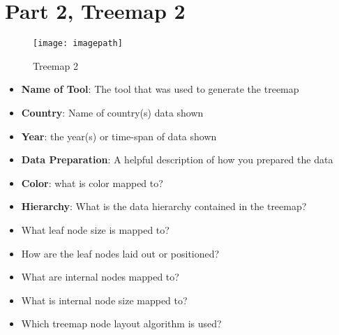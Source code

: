 \hypertarget{part-2-treemap-2}{%
\section{Part 2, Treemap 2}\label{part-2-treemap-2}}

\begin{figure}
\centering
\texttt{[image: imagepath]}
\caption{Treemap 2}
\end{figure}

\begin{itemize}
\tightlist
\item
  \textbf{Name of Tool}: The tool that was used to generate the treemap
\item
  \textbf{Country}: Name of country(s) data shown
\item
  \textbf{Year}: the year(s) or time-span of data shown
\item
  \textbf{Data Preparation}: A helpful description of how you prepared
  the data
\item
  \textbf{Color}: what is color mapped to?
\item
  \textbf{Hierarchy}: What is the data hierarchy contained in the
  treemap?
\item
  What leaf node size is mapped to?
\item
  How are the leaf nodes laid out or positioned?
\item
  What are internal nodes mapped to?
\item
  What is internal node size mapped to?
\item
  Which treemap node layout algorithm is used?
\end{itemize}

